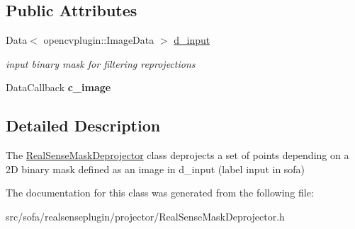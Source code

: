 \subsection*{Public Attributes}
\begin{DoxyCompactItemize}
\item 
\mbox{\label{classsofa_1_1rgbdtracking_1_1_real_sense_mask_deprojector_ada97b307e34090d3fb987124a936459b}} 
Data$<$ opencvplugin\+::\+Image\+Data $>$ \hyperlink{classsofa_1_1rgbdtracking_1_1_real_sense_mask_deprojector_ada97b307e34090d3fb987124a936459b}{d\+\_\+input}
\begin{DoxyCompactList}\small\item\em input binary mask for filtering reprojections \end{DoxyCompactList}\item 
\mbox{\label{classsofa_1_1rgbdtracking_1_1_real_sense_mask_deprojector_a5ef4d4dff52a6f68a3153fbfb9599a4f}} 
Data\+Callback {\bfseries c\+\_\+image}
\end{DoxyCompactItemize}


\subsection{Detailed Description}
The \hyperlink{classsofa_1_1rgbdtracking_1_1_real_sense_mask_deprojector}{Real\+Sense\+Mask\+Deprojector} class deprojects a set of points depending on a 2D binary mask defined as an image in d\+\_\+input (label input in sofa) 

The documentation for this class was generated from the following file\+:\begin{DoxyCompactItemize}
\item 
src/sofa/realsenseplugin/projector/Real\+Sense\+Mask\+Deprojector.\+h\end{DoxyCompactItemize}
